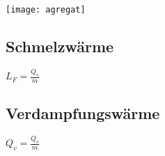 \documentclass[a4paper]{article}
\begin{document}
\begin{multicols}{3}
  \texttt{[image: agregat]}
  
  \subsection{Schmelzwärme}
  
  $ L_F = \frac{Q_s}{m} $
  
  \subsection{Verdampfungswärme}
  
  $ Q_v = \frac{Q_v}{m} $
\end{multicols}

\end{document}
